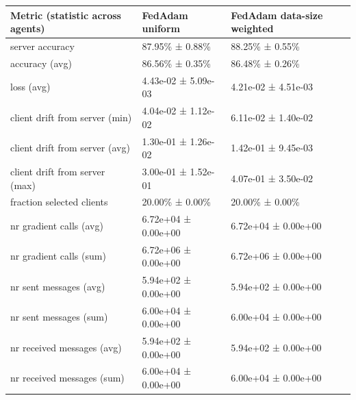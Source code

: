 \begin{tabular}{lll}
\hline
 Metric (statistic across agents)   & FedAdam uniform     & FedAdam data-size weighted   \\
\hline
 server accuracy                    & 87.95\% ± 0.88\%      & 88.25\% ± 0.55\%               \\
 accuracy (avg)                     & 86.56\% ± 0.35\%      & 86.48\% ± 0.26\%               \\
 loss (avg)                         & 4.43e-02 ± 5.09e-03 & 4.21e-02 ± 4.51e-03          \\
 client drift from server (min)     & 4.04e-02 ± 1.12e-02 & 6.11e-02 ± 1.40e-02          \\
 client drift from server (avg)     & 1.30e-01 ± 1.26e-02 & 1.42e-01 ± 9.45e-03          \\
 client drift from server (max)     & 3.00e-01 ± 1.52e-01 & 4.07e-01 ± 3.50e-02          \\
 fraction selected clients          & 20.00\% ± 0.00\%      & 20.00\% ± 0.00\%               \\
 nr gradient calls (avg)            & 6.72e+04 ± 0.00e+00 & 6.72e+04 ± 0.00e+00          \\
 nr gradient calls (sum)            & 6.72e+06 ± 0.00e+00 & 6.72e+06 ± 0.00e+00          \\
 nr sent messages (avg)             & 5.94e+02 ± 0.00e+00 & 5.94e+02 ± 0.00e+00          \\
 nr sent messages (sum)             & 6.00e+04 ± 0.00e+00 & 6.00e+04 ± 0.00e+00          \\
 nr received messages (avg)         & 5.94e+02 ± 0.00e+00 & 5.94e+02 ± 0.00e+00          \\
 nr received messages (sum)         & 6.00e+04 ± 0.00e+00 & 6.00e+04 ± 0.00e+00          \\
\hline
\end{tabular}